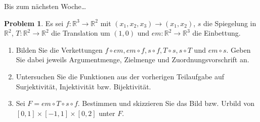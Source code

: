 \documentclass[prb,12pt]{revtex4-2}
\theoremstyle{definition}
\newtheorem{Problem}{Problem}
\theoremstyle{definition}
\newenvironment{parts}{\begin{enumerate}[label=(\alph*)]}{\end{enumerate}}
\newcommand{\R}{\mathbb{R}}
\begin{document}
\newpage
Bis zum nächsten Woche\ldots
\begin{Problem}
Es sei $f: \R^3\to \R^2$ mit $(x_1, x_2, x_3) \to (x_1, x_2)$, $s$ die Spiegelung in $\R^2$, $T : \R^2 \to \R^2$ die Translation um $(1, 0)$ und $em : \R^2 \to \R^3$ die Einbettung.
\begin{parts}
\item 	Bilden Sie die Verkettungen $f \circ em, em \circ f , s \circ f , T \circ s, s \circ T$ und $em \circ s$. Geben Sie dabei jeweils Argumentmenge, Zielmenge und Zuordnungsvorschrift an.
\item  Untersuchen Sie die Funktionen aus der vorherigen Teilaufgabe auf Surjektivit\"{a}t, Injektivit\"{a}t bzw. Bijektivit\"{a}t.
\item  Sei $F = em\circ T \circ s\circ f$. Bestimmen und skizzieren Sie das Bild bzw. Urbild von $[0,1]\times [-1,1]\times [0,2]$ unter  $F$.
\end{parts}
\end{Problem}
\end{document}
